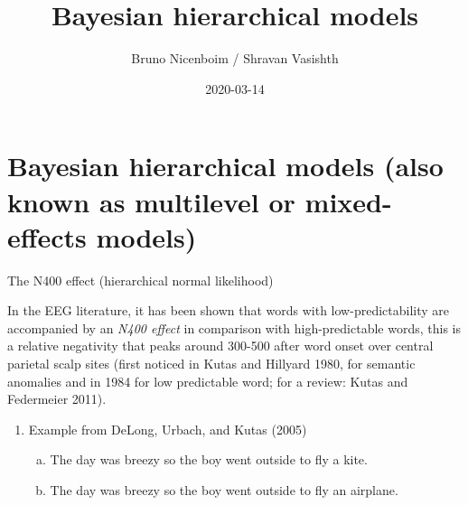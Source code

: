 \documentclass[12pt,ignorenonframetext,aspectratio=169]{beamer}
\title{Bayesian hierarchical models}
\author{Bruno Nicenboim / Shravan Vasishth}
\date{2020-03-14}
\providecommand{\tightlist}{%
  \setlength{\itemsep}{0pt}\setlength{\parskip}{0pt}}
\begin{document}
\frame{\titlepage}

\begin{frame}
\tableofcontents[hideallsubsections]
\end{frame}
\hypertarget{bayesian-hierarchical-models-also-known-as-multilevel-or-mixed-effects-models}{%
\section{Bayesian hierarchical models (also known as multilevel or mixed-effects models)}\label{bayesian-hierarchical-models-also-known-as-multilevel-or-mixed-effects-models}}

\small

\normalsize

\begin{frame}{The N400 effect (hierarchical normal likelihood)}
\protect\hypertarget{the-n400-effect-hierarchical-normal-likelihood}{}

In the EEG literature, it has been shown that words with low-predictability are accompanied by an \emph{N400 effect} in comparison with high-predictable words, this is a relative negativity that peaks around 300-500 after word onset over central parietal scalp sites (first noticed in Kutas and Hillyard 1980, for semantic anomalies and in 1984 for low predictable word; for a review: Kutas and Federmeier 2011).

\begin{enumerate}
\tightlist
\item
  Example from DeLong, Urbach, and Kutas (2005)

  \begin{enumerate}
  [a.]
  \tightlist
  \item
    The day was breezy so the boy went outside to fly a kite.\\
  \item
    The day was breezy so the boy went outside to fly an airplane.
  \end{enumerate}
\end{enumerate}

\end{frame}
\end{document}
